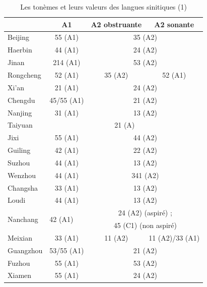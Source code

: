 \documentclass{scrbook}
\newcounter{c}[subsubsection]
\begin{document}
\begin{sloppypar}
\begin{landscape}
\begin{table}[htbp]
  \centering

    \begin{tabular}{l|ccc}
    \toprule
          & A1    & A2 obstruante & A2 sonante \\
    \midrule
    Beijing & 55 (A1) & \multicolumn{2}{c}{35 (A2)} \\
    Haerbin & 44 (A1) & \multicolumn{2}{c}{24 (A2)} \\
    Jinan & 214 (A1) & \multicolumn{2}{c}{53 (A2)} \\
    Rongcheng & 52 (A1) & 35 (A2) & 52 (A1) \\
    Xi'an & 21 (A1) & \multicolumn{2}{c}{24 (A2)} \\
    Chengdu & 45/55 (A1) & \multicolumn{2}{c}{21 (A2)} \\
    Nanjing & 31 (A1) & \multicolumn{2}{c}{13 (A2)} \\
    Taiyuan & \multicolumn{3}{c}{21 (A)} \\
    Jixi  & 55 (A1) & \multicolumn{2}{c}{44 (A2)} \\
    Guiling & 42 (A1) & \multicolumn{2}{c}{22 (A2)} \\
    Suzhou & 44 (A1) & \multicolumn{2}{c}{13 (A2)} \\
    Wenzhou & 44 (A1) & \multicolumn{2}{c}{341 (A2)} \\
    Changsha & 33 (A1) & \multicolumn{2}{c}{13 (A2)} \\
    Loudi & 44 (A1) & \multicolumn{2}{c}{13 (A2)} \\
    \multirow{2}[0]{*}{Nanchang} & \multicolumn{1}{l}{\multirow{2}[0]{*}{42 (A1)}} & \multicolumn{2}{c}{24 (A2) (aspiré) ;} \\
          &       & \multicolumn{2}{c}{45 (C1) (non aspiré)} \\
    Meixian & 33 (A1) & 11 (A2) & 11 (A2)/33 (A1) \\
    Guangzhou & 53/55 (A1) & \multicolumn{2}{c}{21 (A2)} \\
    Fuzhou & 55 (A1) & \multicolumn{2}{c}{53 (A2)} \\
    Xiamen & 55 (A1) & \multicolumn{2}{c}{24 (A2)} \\
    \bottomrule
    \end{tabular}%
  \caption{Les tonèmes et leurs valeurs des langues sinitiques (1)}
  \label{tab:ton_valeur1}%
\end{table}%
\end{landscape}


\end{sloppypar}
\end{document}
